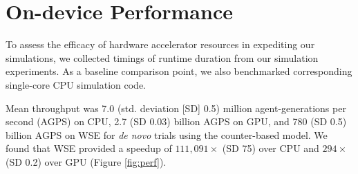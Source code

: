 % 


\section{On-device Performance}
\label{sec:performance}



To assess the efficacy of hardware accelerator resources in expediting our simulations, we collected timings of runtime duration from our simulation experiments.
As a baseline comparison point, we also benchmarked corresponding single-core CPU simulation code.

Mean throughput was 7.0 (std. deviation [SD] 0.5) million agent-generations per second (AGPS) on CPU, 2.7 (SD 0.03) billion AGPS on GPU, and 780 (SD 0.5) billion AGPS on WSE for \textit{de novo} trials using the counter-based model.
We found that WSE provided a speedup of $111,091\times$ (SD 75) over CPU and $294\times$ (SD 0.2) over GPU (Figure \ref{fig:perf}).

